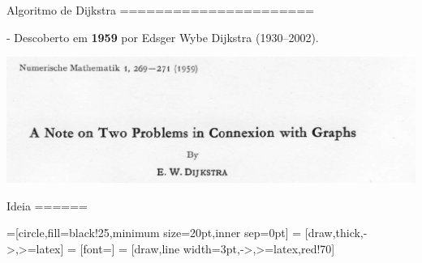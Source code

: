 
Algoritmo de Dijkstra
======================

- Descoberto em {\bf 1959} por Edsger Wybe Dijkstra (1930--2002).

 \includegraphics[scale=0.3]{img/dijkstrapaperheader.png}  

Ideia
======

=[circle,fill=black!25,minimum size=20pt,inner sep=0pt]
 = [draw,thick,->,>=latex]
 = [font=\small]
 = [draw,line width=3pt,->,>=latex,red!70]

